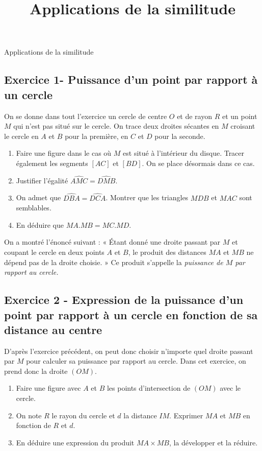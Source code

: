 \documentclass[12 pt]{extarticle}
\title{Applications de la similitude}
\date{}
\theoremstyle{plain}
\begin{document}
\begin{center}{\Large Applications de la similitude}\\ 
 \end{center}
 
 \subsection*{Exercice 1- Puissance d'un point par rapport à un cercle} 
 
 On se donne dans tout l'exercice un cercle de centre $O$ et de rayon $R$ et un point $M$ qui n'est pas situé sur le cercle. On trace deux droites sécantes en
 $M$ croisant le cercle en $A$ et $B$ pour la première, en $C$ et $D$ pour la seconde.
 
 \begin{enumerate}
 \item Faire une figure dans le cas où $M$ est situé à l'intérieur du disque. Tracer également les segments $[AC]$ et $[BD]$. On se place désormais dans ce cas.
 \item Justifier l'égalité $\widehat{AMC}=\widehat{DMB}$.
 \item On admet que $\widehat{DBA}=\widehat{DCA}$. Montrer que les triangles $MDB$ et $MAC$ sont semblables. 
 \item En déduire que $MA.MB=MC.MD$. 
 \end{enumerate}
  
On a montré l'énoncé suivant : « Étant donné une droite passant par $M$ et coupant le cercle en deux points $A$ et $B$, le produit des distances $MA$ et $MB$ ne dépend pas de la droite choisie. » Ce produit s'appelle la \emph{puissance de $M$ par rapport au cercle.}


\subsection*{Exercice 2 - Expression de la puissance d'un point par rapport à un cercle en fonction de sa distance au centre}

D'après l'exercice précédent, on peut donc choisir n'importe quel droite passant par $M$ pour calculer sa puissance par rapport au cercle. Dans cet exercice, on prend donc la droite $(OM)$. 
\begin{enumerate}
\item Faire une figure avec $A$ et $B$ les points d'intersection de $(OM)$ avec le cercle. 
\item On note $R$ le rayon du cercle et $d$ la distance $IM$. Exprimer $MA$ et $MB$ en fonction de $R$ et $d$.
\item En déduire une expression du produit $MA\times MB$, la développer et la réduire.  
\end{enumerate}
\end{document}
